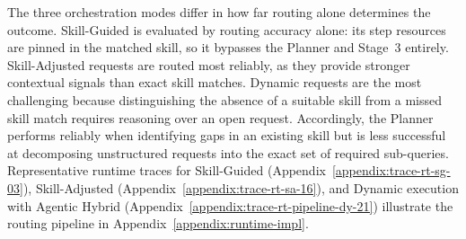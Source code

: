 \documentclass[10pt,twocolumn]{article}
\begin{document}
The three orchestration modes differ in how far routing alone determines the outcome. Skill-Guided is evaluated by routing accuracy alone: its step resources are pinned in the matched skill, so it bypasses the Planner and Stage~3 entirely. Skill-Adjusted requests are routed most reliably, as they provide stronger contextual signals than exact skill matches. Dynamic requests are the most challenging because distinguishing the absence of a suitable skill from a missed skill match requires reasoning over an open request. Accordingly, the Planner performs reliably when identifying gaps in an existing skill but is less successful at decomposing unstructured requests into the exact set of required sub-queries. Representative runtime traces for Skill-Guided (Appendix~\ref{appendix:trace-rt-sg-03}), Skill-Adjusted (Appendix~\ref{appendix:trace-rt-sa-16}), and Dynamic execution with Agentic Hybrid (Appendix~\ref{appendix:trace-rt-pipeline-dy-21}) illustrate the routing pipeline in Appendix~\ref{appendix:runtime-impl}.
\end{document}
